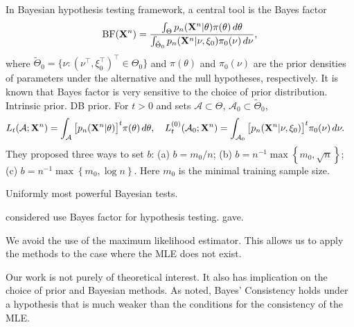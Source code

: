 \documentclass[11pt]{article}
\theoremstyle{plain}
\theoremstyle{definition}
\theoremstyle{remark}
\begin{document}
In Bayesian hypothesis testing framework, a central tool is the Bayes factor
\begin{equation*}
    \text{BF}(\mathbf{X}^{n})=
    \frac{\int_{\Theta} p_n(\mathbf{X}^{n}|\theta)\pi(\theta)\, d\theta}{\int_{\tilde{\Theta}_0}p_n(\mathbf{X}^{n}|\nu,\xi_0)\pi_0(\nu)\, d\nu},
\end{equation*}
where $\tilde{\Theta}_0=\{\nu: (\nu^\top ,\xi_0^\top )^\top \in \Theta_0\}$ and $\pi(\theta)$ and $\pi_0(\nu)$ are the prior densities of parameters under the alternative and the  null hypotheses, respectively.
It is known that Bayes factor is very sensitive to the choice of prior distribution.
Intrinsic prior.
DB prior.
For $t>0$ and sets $\mathcal A\subset \Theta$, $\mathcal A_0\subset \tilde{\Theta}_0$,
\begin{align*}
 &L_t(\mathcal A;\mathbf{X}^{n})=\int_{\mathcal A}\big[p_n(\mathbf{X}^{n}|\theta)\big]^t \pi(\theta)\, d\theta,
\quad
 L_t^{(0)}(\mathcal A_0;\mathbf{X}^{n})=\int_{\mathcal A_0}\big[p_n(\mathbf{X}^{n}|\nu,\xi_0)\big]^t \pi_0(\nu)\, d\nu.
\end{align*}
They proposed three ways to set $b$: (a) $b=m_0/n$; (b) $b= n^{-1}\max \left\{ m_0, \sqrt n \right\}$; (c) $b=n^{-1} \max\left\{ m_0, \log n \right\}$.
Here $m_0$ is the minimal training sample size.



Uniformly most powerful Bayesian tests.

\cite{clarke1990information} considered use Bayes factor for hypothesis testing.
\cite{Gelfand1994} gave.

We avoid the use of the maximum likelihood estimator.
This allows us to apply the methods to the case where the MLE does not exist.


Our work is not purely of theoretical interest.
It also has implication on the choice of prior and Bayesian methods.
As \cite{clarke1990information} noted, Bayes' Consistency holds under a hypothesis that is much weaker than the conditions for the consistency of the MLE.
\end{document}
